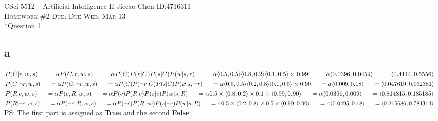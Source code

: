 \documentclass[12pt]{amsart}
\makeatletter
\renewcommand{\section}{\@startsection{section}{1}{0mm}
{-\baselineskip}{0.5\baselineskip}{\bf\leftline}}
\makeatother
\begin{document}
\noindent CSci 5512 -- Artificial Intelligence II \hfill Jiecao Chen \hfill ID:4716311 \\
\textsc{Homework \#2 \hfill Due: Due Wed, Mar 13}\\

\section*{Question 1} 
\subsection*{a}
$P(C|r,w,s)\\
\indent =\alpha P(C,r,w,s)\\ 
\indent =\alpha P(C)P(r|C)P(s|C)P(w|s,r)\\
\indent =\alpha \langle 0.5,0.5\rangle\langle 0.8,0.2\rangle\langle 0.1,0.5\rangle\times 0.99\\
\indent =\alpha \langle 0.0396,0.0459\rangle\\
\indent =\langle 0.4444,0.5556\rangle$\\

$P(C|\neg r,w,s)\\
\indent =\alpha P(C,\neg r,w,s)\\ 
\indent =\alpha P(C)P(\neg r|C)P(s|C)P(w|s,\neg r)\\
\indent =\alpha \langle 0.5,0.5\rangle\langle 0.2,0.8\rangle\langle 0.1,0.5\rangle\times 0.90\\
\indent =\alpha \langle 0.009,0.18\rangle\\
\indent =\langle 0.047619,0.952381\rangle$\\


$P(R|c,w,s)\\
\indent =\alpha P(c,R,w,s)\\ 
\indent =\alpha P(c)P(R|c)P(s|c)P(w|s,R)\\
\indent =\alpha 0.5\times \langle 0.8,0.2\rangle\times 0.1 \times \langle 0.99,0.90\rangle\\
\indent =\alpha \langle 0.0396, 0.009\rangle\\
\indent =\langle 0.814815, 0.185185\rangle$\\

$P(R|\neg c,w,s)\\
\indent =\alpha P(\neg c,R,w,s)\\ 
\indent =\alpha P(\neg c)P(R|\neg c)P(s|\neg c)P(w|s,R)\\
\indent =\alpha 0.5\times \langle 0.2,0.8\rangle\times 0.5 \times \langle 0.99,0.90\rangle\\
\indent =\alpha \langle 0.0495, 0.18\rangle\\
\indent =\langle 0.215686, 0.784314\rangle$\\
PS: The first part is assigned as \textbf{True} and the second \textbf{False}
\end{document}
